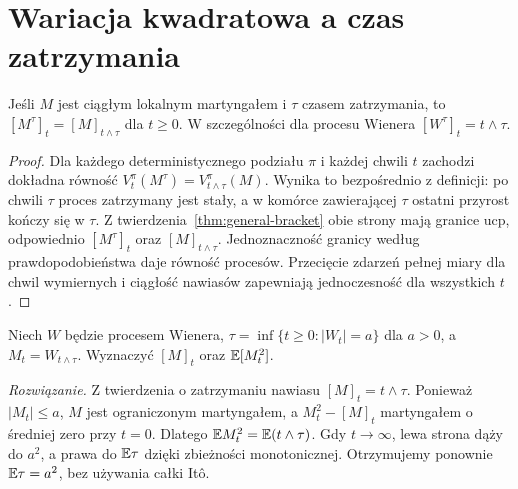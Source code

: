 \section{Wariacja kwadratowa a czas zatrzymania}
\begin{twierdzenie}
Jeśli $M$ jest ciągłym lokalnym martyngałem i
$\tau$ czasem zatrzymania, to
$[M^\tau]_t=[M]_{t\wedge\tau}$ dla $t\ge0$.
W szczególności dla procesu Wienera
$[W^\tau]_t=t\wedge\tau$.
\end{twierdzenie}
\begin{proof}
Dla każdego deterministycznego podziału $\pi$ i każdej
chwili $t$ zachodzi dokładna równość
$V_t^\pi(M^\tau)=V_{t\wedge\tau}^\pi(M)$.
Wynika to bezpośrednio z definicji: po chwili $\tau$
proces zatrzymany jest stały, a w komórce zawierającej
$\tau$ ostatni przyrost kończy się w $\tau$.
Z twierdzenia~\ref{thm:general-bracket} obie strony
mają granice ucp, odpowiednio $[M^\tau]_t$ oraz
$[M]_{t\wedge\tau}$. Jednoznaczność granicy według
prawdopodobieństwa daje równość procesów.
Przecięcie zdarzeń pełnej miary dla chwil wymiernych
i ciągłość nawiasów zapewniają jednoczesność dla wszystkich $t$.
\end{proof}

\begin{zadanie}
Niech $W$ będzie procesem Wienera,
$\tau=\inf\{t\ge0:|W_t|=a\}$ dla $a>0$,
a $M_t=W_{t\wedge\tau}$.
Wyznaczyć $[M]_t$ oraz $\mathbb{E}[M_t^2]$.

\emph{Rozwiązanie.} Z twierdzenia o zatrzymaniu nawiasu
$[M]_t=t\wedge\tau$. Ponieważ $|M_t|\le a$,
$M$ jest ograniczonym martyngałem, a
$M_t^2-[M]_t$ martyngałem o średniej zero przy $t=0$.
Dlatego $\mathbb{E} M_t^2=\mathbb{E}(t\wedge\tau)$.
Gdy $t\to\infty$, lewa strona dąży do $a^2$,
a prawa do $\mathbb{E}\tau$ dzięki zbieżności monotonicznej.
Otrzymujemy ponownie $\mathbb{E}\tau=a^2$, bez używania
całki Itô.
\end{zadanie}


